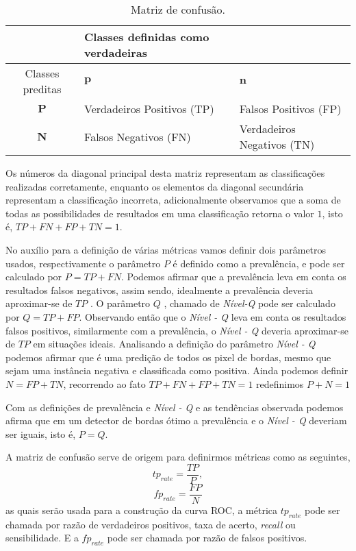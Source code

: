 \begin{table}[hbt]
	\centering
	\caption{Matriz de confusão.}\label{cap_fusao_tab01}
\begin{tabular}{@{}cll@{}} \toprule
	                        & Classes definidas como verdadeiras       &                             \\ \midrule
	 Classes preditas       & $\mathbf{p}$                       & $\mathbf{n}$                        \\
                         $\mathbf{P}$& Verdadeiros Positivos (TP) & Falsos Positivos (FP)      \\ 
	                     $\mathbf{N}$& Falsos Negativos (FN)      & Verdadeiros Negativos (TN) \\ \bottomrule 
\end{tabular}
\end{table}

 Os números da diagonal principal desta matriz representam as classificações realizadas corretamente, enquanto os elementos da diagonal secundária representam a classificação incorreta, adicionalmente observamos que a soma de todas as possibilidades de resultados em uma classificação retorna o valor $1$, isto é, $TP+FN+FP+TN=1$.


No auxílio para a definição de várias métricas vamos definir dois parâmetros usados, respectivamente o parâmetro $P$ é definido como a prevalência, e pode ser calculado por $P=TP+FN$. Podemos afirmar que a prevalência leva em conta os resultados falsos negativos, assim sendo, idealmente a prevalência deveria aproximar-se de $TP$ . O parâmetro $Q$ , chamado de \textit{Nível-Q} pode ser calculado por $Q=TP+FP$. Observando então que o \textit{Nível - Q} leva em conta os resultados falsos positivos, similarmente com a prevalência, o \textit{Nível - Q} deveria aproximar-se de $TP$ em situações ideais. Analisando a definição do parâmetro \textit{Nível - Q} podemos afirmar que  é uma predição de todos os pixel de bordas, mesmo que sejam uma instância negativa e classificada como positiva. Ainda podemos definir $N=FP+TN$, recorrendo ao fato $TP+FN+FP+TN=1$ redefinimos $P+N=1$  

Com as definições de prevalência e \textit{Nível - Q} e as tendências observada podemos afirma que em um detector de bordas ótimo a prevalência e o \textit{Nível - Q} deveriam ser iguais, isto é, $P=Q$.

A matriz de confusão serve de origem para definirmos métricas como as seguintes,
\begin{equation}\label{cap_fusao_eq_01}
	tp_{rate}=\frac{TP}{P},
\end{equation}
\begin{equation}\label{cap_fusao_eq_02}
	fp_{rate}=\frac{FP}{N}
\end{equation}
as quais serão usada para a construção da curva ROC, a métrica $tp_{rate}$ pode ser chamada por razão de verdadeiros positivos, taxa de acerto, \textit{recall} ou  sensibilidade. E a $fp_{rate}$ pode ser chamada por razão de falsos positivos.

